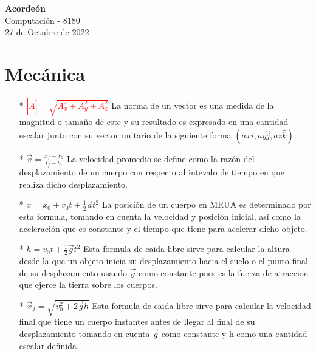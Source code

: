 \documentclass[a4paper, 12pt]{article}
\begin{document}
\begin{center}
\huge{\textbf{Acordeón}}\\
\Large{Computación - 8180\\
27 de Octubre de 2022}
\end{center}

\section{Mecánica}
\begin{enumerate}\small
    \item[*] \textcolor{red}{{$|\vec{A}|=\sqrt{A_{x}^{2}+A_{y}^{2}+A_{z}^{2}}$}} La norma de un vector es una medida de la magnitud o tamaño de este y su resultado es expresado en una cantidad escalar junto con su vector unitario de la siguiente forma $(ax\hat{i},ay\hat{j},az\hat{k}).$
    \item[*] {$\vec{v}=\frac{x_{f}-x_{0}}{t_{f}-t_{0}}$} La velocidad promedio se define como la razón del desplazamiento de un cuerpo con respecto al intevalo de tiempo en que realiza dicho desplazamiento.
    \item[*] {$x=x_{0}+v_{0}t+\frac{1}{2}\vec{a}t^{2}$} La posición de un cuerpo en MRUA es determinado por esta formula, tomando en cuenta la velocidad y posición inicial, así como la aceleración que es constante y el tiempo que tiene para acelerar dicho objeto.
    \item[*] {$h=v_{0}t+\frac{1}{2}\vec{g}t^{2}$} Esta formula de caida libre sirve para calcular la altura desde la que un objeto inicia su desplazamiento hacia el suelo o el punto final de su desplazamiento usando $\vec{g}$ como constante pues es la fuerza de atraccion que ejerce la tierra sobre los cuerpos.
    \item[*] {$\vec{v}_{f}=\sqrt{v_{0}^{2}+2\vec{g}h}$} Esta formula de caida libre sirve para calcular la velocidad final que tiene un cuerpo instantes antes de llegar al final de su desplazamiento tomando en cuenta $\vec{g}$ como constante y h como una cantidad escalar definida.

\end{enumerate}
\end{document}
